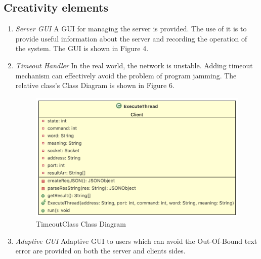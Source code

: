 \documentclass[a4paper]{article}
\begin{document}
\subsection{Creativity elements}
\begin{enumerate}
\item \textit{Server GUI}
A GUI for managing the server is provided. The use of it is to provide useful information about the server and recording the operation of the system. The GUI is shown in Figure 4.

\item \textit{Timeout Handler}
In the real world, the network is unstable. Adding timeout mechanism can effectively avoid the problem of program jamming. The relative class's Class Diagram is shown in Figure 6.
\begin{figure}[H]
	\includegraphics[width=\linewidth]{timeoutUML.png}
	\caption{TimeoutClass Class Diagram}
\end{figure}

\item \textit{Adaptive GUI}
Adaptive GUI to users which can avoid the Out-Of-Bound text error are provided on both the server and clients sides. 

\end{enumerate}
\end{document}
